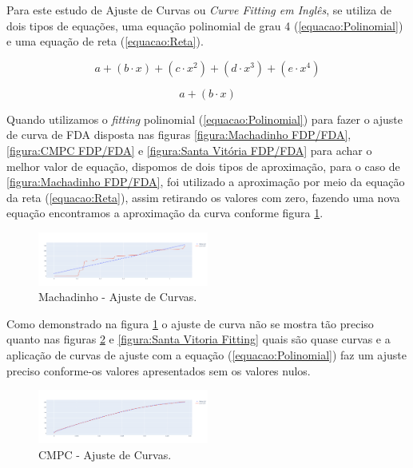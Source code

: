 \documentclass[conference]{IEEEtran}
\begin{document}
Para este estudo de Ajuste de Curvas ou \textit{Curve Fitting em Inglês}, se utiliza de dois tipos de equações, uma equação polinomial de grau 4 (\ref{equacao:Polinomial}) e uma equação de reta (\ref{equacao:Reta}).

\begin{equation}
\label{equacao:Polinomial}
a + (b \cdot x) + (c \cdot x^{2}) + (d \cdot x^{3}) + (e \cdot x^{4})
\end{equation}

\begin{equation}
\label{equacao:Reta}
a + (b \cdot x)
\end{equation}

Quando utilizamos o \textit{fitting} polinomial (\ref{equacao:Polinomial}) para fazer o ajuste de curva de FDA disposta nas figuras \ref{figura:Machadinho FDP/FDA}, \ref{figura:CMPC FDP/FDA} e \ref{figura:Santa Vitória FDP/FDA} para achar o melhor valor de equação, dispomos de dois tipos de aproximação, para o caso de \ref{figura:Machadinho FDP/FDA}, foi utilizado a aproximação por meio da equação da reta (\ref{equacao:Reta}), assim retirando os valores com zero, fazendo uma nova equação encontramos a aproximação da curva conforme figura \ref{figura:Machadinho Fitting}.

\begin{figure}[h]
\includegraphics[width=0.50\textwidth]{Figuras/FITTING_MACHADINHO_SEM_ZERO.png}
\centering
\caption{Machadinho - Ajuste de Curvas.}
\label{figura:Machadinho Fitting}
\end{figure}

Como demonstrado na figura \ref{figura:Machadinho Fitting} o ajuste de curva não se mostra tão preciso quanto nas figuras \ref{figura:CMPC Fitting} e \ref{figura:Santa Vitoria Fitting} quais são quase curvas e a aplicação de curvas de ajuste com a equação (\ref{equacao:Polinomial}) faz um ajuste preciso conforme-os valores apresentados sem os valores nulos.

\begin{figure}[h]
\includegraphics[width=0.5\textwidth]{Figuras/FITTING_CMPC_SEM_ZERO.png}
\centering
\caption{CMPC - Ajuste de Curvas.}
\label{figura:CMPC Fitting}
\end{figure}
\end{document}
